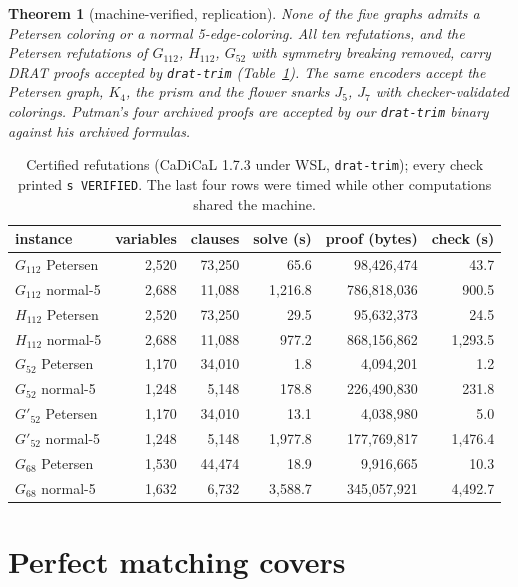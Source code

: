 \documentclass[11pt]{article}
\newtheorem{theorem}{Theorem}[section]
\theoremstyle{definition}
\theoremstyle{remark}
\newcommand{\Gmain}{G_{112}}
\newcommand{\Gsym}{H_{112}}
\newcommand{\Gfty}{G_{52}}
\newcommand{\Gftyb}{G'_{52}}
\newcommand{\Gsix}{G_{68}}
\begin{document}
\begin{theorem}[machine-verified, replication]\label{thm:certify}
None of the five graphs admits a Petersen coloring or a normal 5-edge-coloring. All ten
refutations, and the Petersen refutations of $\Gmain$, $\Gsym$, $\Gfty$ with symmetry breaking
removed, carry DRAT proofs accepted by \texttt{drat-trim} (Table~\ref{tab:certify}). The same encoders accept the
Petersen graph, $K_4$, the prism and the flower snarks $J_5$, $J_7$ with checker-validated
colorings. Putman's four archived proofs are accepted by our \texttt{drat-trim} binary against
his archived formulas.
\end{theorem}

\begin{table}[h]\centering\small
\begin{tabular}{lrrrrr}
\toprule
instance & variables & clauses & solve (s) & proof (bytes) & check (s)\\
\midrule
$\Gmain$ Petersen & 2{,}520 & 73{,}250 & 65.6 & 98{,}426{,}474 & 43.7\\
$\Gmain$ normal-5 & 2{,}688 & 11{,}088 & 1{,}216.8 & 786{,}818{,}036 & 900.5\\
$\Gsym$ Petersen & 2{,}520 & 73{,}250 & 29.5 & 95{,}632{,}373 & 24.5\\
$\Gsym$ normal-5 & 2{,}688 & 11{,}088 & 977.2 & 868{,}156{,}862 & 1{,}293.5\\
$\Gfty$ Petersen & 1{,}170 & 34{,}010 & 1.8 & 4{,}094{,}201 & 1.2\\
$\Gfty$ normal-5 & 1{,}248 & 5{,}148 & 178.8 & 226{,}490{,}830 & 231.8\\
$\Gftyb$ Petersen & 1{,}170 & 34{,}010 & 13.1 & 4{,}038{,}980 & 5.0\\
$\Gftyb$ normal-5 & 1{,}248 & 5{,}148 & 1{,}977.8 & 177{,}769{,}817 & 1{,}476.4\\
$\Gsix$ Petersen & 1{,}530 & 44{,}474 & 18.9 & 9{,}916{,}665 & 10.3\\
$\Gsix$ normal-5 & 1{,}632 & 6{,}732 & 3{,}588.7 & 345{,}057{,}921 & 4{,}492.7\\
\bottomrule
\end{tabular}
\caption{Certified refutations (CaDiCaL 1.7.3 under WSL, \texttt{drat-trim}); every check printed
\texttt{s VERIFIED}. The last four rows were timed while other computations shared the machine.}\label{tab:certify}
\end{table}

\section{Perfect matching covers}\label{sec:covers}
\end{document}
